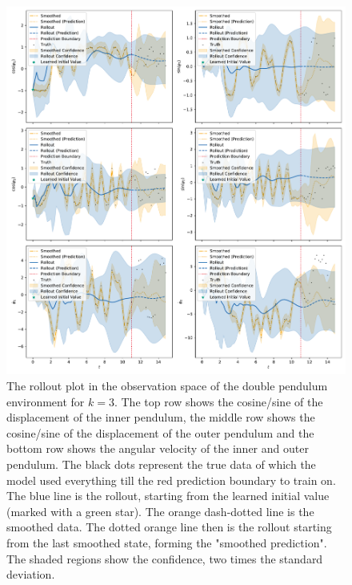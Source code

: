 		\begin{figure}
			\centering
			\includegraphics[width=0.9\linewidth]{figures/results/acrobot-gym/run-latent-dim-03/rollout-observations-N0.pdf}
			\caption{The rollout plot in the observation space of the double pendulum environment for \(k = 3\). The top row shows the cosine/sine of the displacement of the inner pendulum, the middle row shows the cosine/sine of the displacement of the outer pendulum and the bottom row shows the angular velocity of the inner and outer pendulum. The black dots represent the true data of which the model used everything till the red prediction boundary to train on. The blue line is the rollout, starting from the learned initial value (marked with a green star). The orange dash-dotted line is the smoothed data. The dotted orange line then is the rollout starting from the last smoothed state, forming the "smoothed prediction". The shaded regions show the confidence, \ie two times the standard deviation.}
			\label{fig:acrobotRolloutL03}
		\end{figure}

